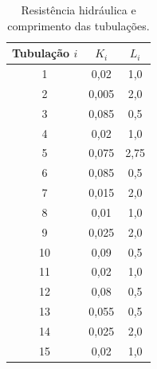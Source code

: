\documentclass[12pt,a4paper]{article}
\begin{document}
\begin{enumerate}
  \begin{table}[H]
    \centering
    \begin{tabular}{c|c|c}
      Tubulação $i$ & $K_i$ & $L_i$ \\ \hline
      1 & 0,02 & 1,0 \\ \hline
      2 & 0,005 & 2,0 \\ \hline
      3 & 0,085 & 0,5 \\ \hline
      4 & 0,02 & 1,0 \\ \hline
      5 & 0,075 & 2,75 \\ \hline
      6 & 0,085 & 0,5 \\ \hline
      7 & 0,015 & 2,0 \\ \hline
      8 & 0,01 & 1,0  \\ \hline
      9 & 0,025 & 2,0 \\ \hline
      10 & 0,09 & 0,5 \\ \hline
      11 & 0,02 & 1,0 \\ \hline
      12 & 0,08 & 0,5 \\ \hline
      13 & 0,055 & 0,5 \\ \hline
      14 & 0,025 & 2,0 \\ \hline
      15 & 0,02 & 1,0 
    \end{tabular}
    \caption{Resistência hidráulica e comprimento das tubulações.}
    \label{tab:dados}
  \end{table}

\end{enumerate}
\end{document}
